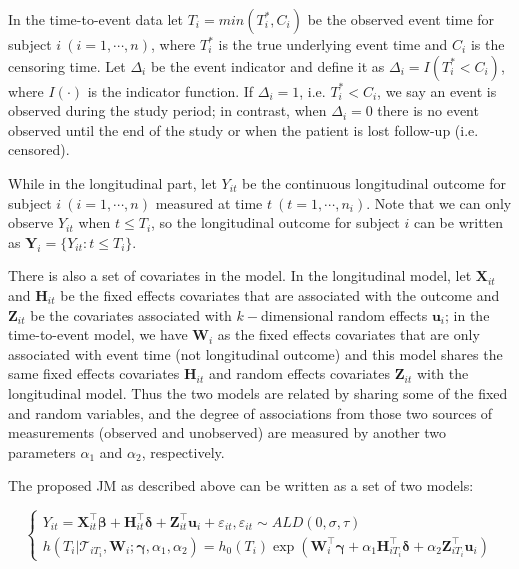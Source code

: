 In the time-to-event data let $T_i=min(T_i^*, C_i)$ be the observed event time for subject $i\ (i=1, \cdots, n)$, where $T_i^*$ is the true underlying event time and $C_i$ is the censoring time. Let $\Delta_i$ be the event indicator and define it as $\Delta_i = I(T_i^* < C_i)$, where $I(\cdot)$ is the indicator function. If $\Delta_i=1$, i.e. $T_i^* < C_i$, we say an event is observed during the study period; in contrast, when $\Delta_i=0$ there is no event observed until the end of the study or when the patient is lost follow-up (i.e. censored).\par

While in the longitudinal part, let $Y_{it}$ be the continuous longitudinal outcome for subject $i\ (i=1, \cdots, n)$ measured at time $t\ (t=1, \cdots, n_i)$. Note that we can only observe $Y_{it}$ when $t\le T_i$, so the longitudinal outcome for subject $i$ can be written as ${\boldsymbol Y}_i=\{Y_{it}: t\le T_i\}$.\par

There is also a set of covariates in the model. In the longitudinal model, let $\boldsymbol{X}_{it}$ and $\boldsymbol{H}_{it}$ be the fixed effects covariates that are associated with the outcome and $\boldsymbol{Z}_{it}$ be the covariates associated with $k-$dimensional random effects $\boldsymbol{u}_i$; in the time-to-event model, we have $\boldsymbol{W}_{i}$ as the fixed effects covariates that are only associated with event time (not longitudinal outcome) and this model shares the same fixed effects covariates $\boldsymbol{H}_{it}$ and random effects covariates $\boldsymbol{Z}_{it}$ with the longitudinal model. Thus the two models are related by sharing some of the fixed and random variables, and the degree of associations from those two sources of measurements (observed and unobserved) are measured by another two parameters $\alpha_1$ and $\alpha_2$, respectively.\par


The proposed JM as described above can be written as a set of two models:

\begin{equation}\label{eqn:joint}
\left\{
\begin{array}{l}
Y_{it} = {\boldsymbol X}_{it}^{\top}\boldsymbol{\beta} + {\boldsymbol H}_{it}^{\top}\boldsymbol{\delta} + {\boldsymbol Z}_{it}^{\top}{\boldsymbol u}_i + \varepsilon_{it}, \varepsilon_{it}\sim ALD(0, \sigma,\tau)\\
h(T_i|\mathcal{T}_{iT_i}, {\boldsymbol W}_i;  \boldsymbol{\gamma}, \alpha_1, 
\alpha_2) = h_0(T_i)\exp({\boldsymbol W}_i^{\top}\boldsymbol{\gamma} + \alpha_1{\boldsymbol H}_{iT_i}^{\top}\boldsymbol{\delta} + \alpha_2{\boldsymbol Z}_{iT_i}^{\top}{\boldsymbol u}_{i})
\end{array}
\right.
\end{equation}


